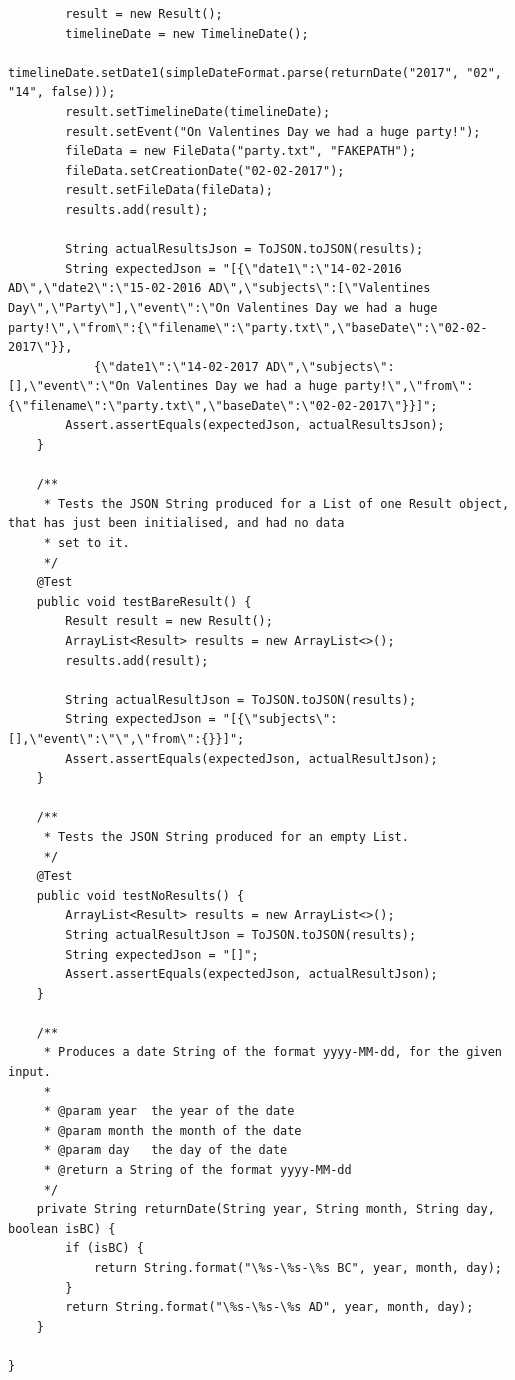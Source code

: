 \begin{lstlisting}
        result = new Result();
        timelineDate = new TimelineDate();
        timelineDate.setDate1(simpleDateFormat.parse(returnDate("2017", "02", "14", false)));
        result.setTimelineDate(timelineDate);
        result.setEvent("On Valentines Day we had a huge party!");
        fileData = new FileData("party.txt", "FAKEPATH");
        fileData.setCreationDate("02-02-2017");
        result.setFileData(fileData);
        results.add(result);

        String actualResultsJson = ToJSON.toJSON(results);
        String expectedJson = "[{\"date1\":\"14-02-2016 AD\",\"date2\":\"15-02-2016 AD\",\"subjects\":[\"Valentines Day\",\"Party\"],\"event\":\"On Valentines Day we had a huge party!\",\"from\":{\"filename\":\"party.txt\",\"baseDate\":\"02-02-2017\"}},
        	{\"date1\":\"14-02-2017 AD\",\"subjects\":[],\"event\":\"On Valentines Day we had a huge party!\",\"from\":{\"filename\":\"party.txt\",\"baseDate\":\"02-02-2017\"}}]";
        Assert.assertEquals(expectedJson, actualResultsJson);
    }

    /**
     * Tests the JSON String produced for a List of one Result object, that has just been initialised, and had no data
     * set to it.
     */
    @Test
    public void testBareResult() {
        Result result = new Result();
        ArrayList<Result> results = new ArrayList<>();
        results.add(result);

        String actualResultJson = ToJSON.toJSON(results);
        String expectedJson = "[{\"subjects\":[],\"event\":\"\",\"from\":{}}]";
        Assert.assertEquals(expectedJson, actualResultJson);
    }

    /**
     * Tests the JSON String produced for an empty List.
     */
    @Test
    public void testNoResults() {
        ArrayList<Result> results = new ArrayList<>();
        String actualResultJson = ToJSON.toJSON(results);
        String expectedJson = "[]";
        Assert.assertEquals(expectedJson, actualResultJson);
    }

    /**
     * Produces a date String of the format yyyy-MM-dd, for the given input.
     *
     * @param year  the year of the date
     * @param month the month of the date
     * @param day   the day of the date
     * @return a String of the format yyyy-MM-dd
     */
    private String returnDate(String year, String month, String day, boolean isBC) {
        if (isBC) {
            return String.format("\%s-\%s-\%s BC", year, month, day);
        }
        return String.format("\%s-\%s-\%s AD", year, month, day);
    }

}
\end{lstlisting}
